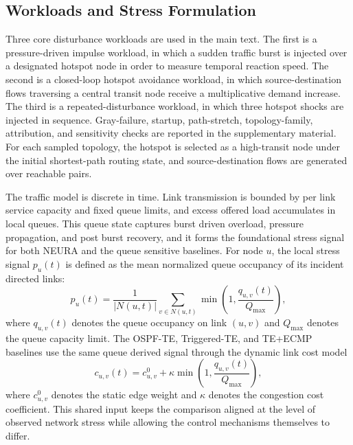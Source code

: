 \documentclass[5p,times]{elsarticle}
\begin{document}
\subsection{Workloads and Stress Formulation}

Three core disturbance workloads are used in the main text. The first is a pressure-driven impulse workload, in which a sudden traffic burst is injected over a designated hotspot node in order to measure temporal reaction speed. The second is a closed-loop hotspot avoidance workload, in which source-destination flows traversing a central transit node receive a multiplicative demand increase. The third is a repeated-disturbance workload, in which three hotspot shocks are injected in sequence. Gray-failure, startup, path-stretch, topology-family, attribution, and sensitivity checks are reported in the supplementary material. For each sampled topology, the hotspot is selected as a high-transit node under the initial shortest-path routing state, and source-destination flows are generated over reachable pairs.

The traffic model is discrete in time. Link transmission is bounded by per link service capacity and fixed queue limits, and excess offered load accumulates in local queues. This queue state captures burst driven overload, pressure propagation, and post burst recovery, and it forms the foundational stress signal for both NEURA and the queue sensitive baselines. For node $u$, the local stress signal $p_u(t)$ is defined as the mean normalized queue occupancy of its incident directed links:
\begin{equation}
p_u(t) = \frac{1}{|N(u,t)|} \sum_{v \in N(u,t)} \min \left(1, \frac{q_{u,v}(t)}{Q_{\max}} \right),
\end{equation}
where $q_{u,v}(t)$ denotes the queue occupancy on link $(u,v)$ and $Q_{\max}$ denotes the queue capacity limit. The OSPF-TE, Triggered-TE, and TE+ECMP baselines use the same queue derived signal through the dynamic link cost model
\begin{equation}
c_{u,v}(t) = c^{0}_{u,v} + \kappa \min \left(1, \frac{q_{u,v}(t)}{Q_{\max}} \right),
\end{equation}
where $c^{0}_{u,v}$ denotes the static edge weight and $\kappa$ denotes the congestion cost coefficient. This shared input keeps the comparison aligned at the level of observed network stress while allowing the control mechanisms themselves to differ.
\end{document}
